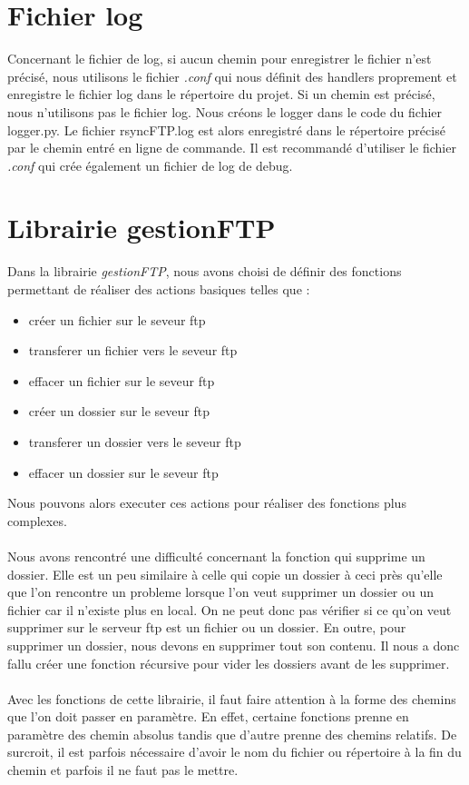 \section{Fichier log}

Concernant le fichier de log, si aucun chemin pour enregistrer le fichier n'est précisé, nous utilisons le fichier \textit{.conf} 
qui nous définit des handlers proprement et enregistre le fichier log dans le répertoire du projet.
Si un chemin est précisé, nous n'utilisons pas le fichier log. 
Nous créons le logger dans le code du fichier logger.py. 
Le fichier rsyncFTP.log est alors enregistré dans le répertoire précisé par le chemin entré en ligne de commande.
Il est recommandé d'utiliser le fichier \textit{.conf} qui crée également un fichier de log de debug.


\section{Librairie gestionFTP}

Dans la librairie \textit{gestionFTP}, nous avons choisi de définir des fonctions permettant de réaliser des actions basiques telles que : 
\begin{itemize}
\item créer un fichier sur le seveur ftp
\item transferer un fichier vers le seveur ftp
\item effacer un fichier sur le seveur ftp
\item créer un dossier sur le seveur ftp
\item transferer un dossier vers le seveur ftp
\item effacer un dossier sur le seveur ftp
\end{itemize}

Nous pouvons alors executer ces actions pour réaliser des fonctions plus complexes.\\
\\
Nous avons rencontré une difficulté concernant la fonction qui supprime un dossier. 
Elle est un peu similaire à celle qui copie un dossier à ceci près qu'elle que l'on rencontre un probleme lorsque l'on
veut supprimer un dossier ou un fichier car il n'existe plus en local. On ne peut donc pas vérifier si ce 
qu'on veut supprimer sur le serveur ftp est un fichier ou un dossier. En outre, pour supprimer un dossier, nous devons en supprimer 
tout son contenu. Il nous a donc fallu créer une fonction récursive pour vider les dossiers avant de les supprimer.\\
\\
Avec les fonctions de cette librairie, il faut faire attention à la forme des chemins que l'on doit passer en paramètre. 
En effet, certaine fonctions prenne en paramètre des chemin absolus tandis que d'autre prenne des chemins relatifs. 
De surcroit, il est parfois nécessaire d'avoir le nom du fichier ou répertoire à la fin du chemin et parfois il ne faut pas le mettre.


